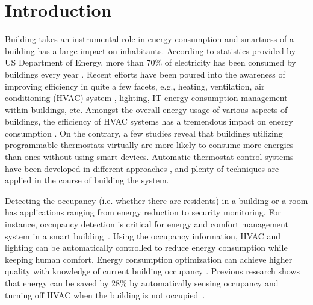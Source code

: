 \section{Introduction}
Building takes an instrumental role in energy consumption and smartness of a
building has a large impact on inhabitants. According to statistics provided by
US Department of Energy, more than 70\% of electricity has been consumed by
buildings every year \cite{doe_annual}. Recent efforts have been poured into the awareness of
improving efficiency in quite a few facets, e.g., heating, ventilation, air
conditioning (HVAC) system \cite{erickson2009energy}\cite{gao2009selfprog},
lighting\cite{delaney2009eval}, IT energy consumption management within
buildings\cite{agarwal2009augnet}\cite{agarwal2010sleep}, etc. Amongst the
overall energy usage of various aspects of buildings, the efficiency of HVAC
systems has a tremendous impact on energy consumption \cite{hobby2012analysis}.
On the contrary, a few studies \cite{bias1999elec} reveal that buildings
utilizing programmable thermostats virtually are more likely to consume more
energies than ones without using smart devices. Automatic thermostat control
systems have been developed in different approaches
\cite{thomas2012intelligent}\cite{lu2012eval}, and plenty of techniques are
applied in the course of building the system.

Detecting the occupancy (i.e. whether there are residents) in a building or a
room has applications ranging from energy reduction to security monitoring. For
instance, occupancy detection is critical for energy and comfort management
system in a smart building~\cite{Nguyen2013Energy}.  Using the occupancy
information, HVAC and lighting can be automatically controlled to reduce energy
consumption while keeping human comfort. Energy consumption optimization can
achieve higher quality with knowledge of current building occupancy
\cite{majumdar2014energy}. Previous research shows that energy
can be saved by 28\% by automatically sensing occupancy and turning off HVAC
when the building is not occupied~\cite{Lu:SenSys10}.

